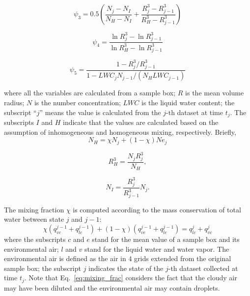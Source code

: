 \documentclass[draft,jgrga]{AGUTeX}
\newcommand{\Eq}[1]{Eq.~\eqref{#1}} \newcommand{\Fig}[1]{Figure~\ref{#1}}
\begin{document}
\begin{article}
\begin{equation}
\psi_3 = 0.5(\frac{N_j-N_{I}}{N_H-N_I} + \frac{R_j^3-R_{j-1}^3}{R_H^3 - R_{j-1}^3})
\label{phi2}
\end{equation}

\begin{equation}
\psi_4 = \frac{\ln R_j^3 - \ln R_{j-1}^3}{\ln R_{H}^3 - \ln R_{j-1}^3}
\label{phi3}
\end{equation}

\begin{equation}
\psi_5 = \frac{1 - R_{j}^3/R_{j-1}^3}{1 - LWC_{j}N_{j-1}/(N_H LWC_{j-1})}
\label{phi4}
\end{equation}

where all the variables are calculated from a sample box; $R$ is the mean volume radius; $N$ is the number concentration; $LWC$ is the liquid water content; the subscript ``$j$'' means the value is calculated from the $j$-th dataset at time $t_j$. The subscripts $I$ and $H$ indicate that the values are calculated based on the assumption of inhomogeneous and homogeneous mixing, respectively. Briefly,
\[
N_H = \chi N_j + (1 - \chi) Ne_j
\]

\[
R_H^3 = \frac{N_jR_j^3}{N_H},
\]

\[
N_I = \frac{R_j^3}{R_{j-1}^3}N_j.
\]



The mixing fraction $\chi$ is computed according to the mass conservation of total water between state $j$ and $j-1$:
\begin{equation}
\chi(q^{j-1}_{vc} + q^{j-1}_{lc}) + (1-\chi)(q^{j-1}_{ve} + q^{j-1}_{le}) = q^{j}_{lc} + q^{j}_{vc}
\label{eq:mixing_frac}
\end{equation}
where the subscripts $c$ and $e$ stand for the mean 
value of a sample box and its environmental air; $l$ and $v$ stand for the liquid 
water and water vapor. The environmental air is defined as the air in $4$ 
grids extended from the original sample box; the subscript $j$ indicates the state of the $j$-th dataset 
collected at time $t_j$. Note that \Eq{eq:mixing_frac} considers the fact that the cloudy air may have 
been diluted and the environmental air may contain droplets.


\end{article}
\end{document}
